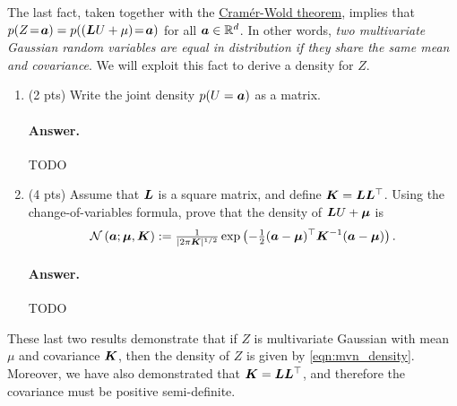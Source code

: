 \documentclass[11pt,letterpaper]{article}
\newenvironment{answer}{%
    \vspace{1em}
    \color{black}
    \paragraph{Answer.}
  }{%
    \vspace{1em}
  }
\begin{document}
The last fact, taken together with the \href{https://en.wikipedia.org/wiki/Cram\%C3\%A9r\%E2\%80\%93Wold_theorem}{Cram\'er-Wold theorem},
implies that $p(Z \! = \! {\bm{a}}) = p(({\bm{L}} U + \mu) \! = \! {\bm{a}})$ for all ${\bm{a}} \in \mathbb{R}^d$.
In other words, \emph{two multivariate Gaussian random variables are equal in distribution if they share the same mean and covariance}.
We will exploit this fact to derive a density for $Z$.


\begin{enumerate}[resume]
  \item (2 pts) Write the joint density $p(U = {\bm{a}})$ as a matrix.

\begin{answer}
  TODO
\end{answer}


  \item (4 pts) Assume that ${\bm{L}}$ is a square matrix, and define ${\bm{K}} = {\bm{L}}{\bm{L}}^\top$.
    Using the change-of-variables formula, prove that the density of ${\bm{L}} U + {\bm{\mu}}$ is
    \begin{equation}
      \mathcal{N} \left( {\bm{a}}; {\bm{\mu}}, {\bm{K}} \right)
      := \tfrac{1}{\vert 2 \pi {\bm{K}} \vert^{1/2}} \exp \left( -\tfrac{1}{2} ({\bm{a}} - {\bm{\mu}})^\top {\bm{K}}^{-1} ({\bm{a}} - {\bm{\mu}}) \right).
      \label{eqn:mvn_density}
    \end{equation}

\begin{answer}
  TODO
\end{answer}

\end{enumerate}

These last two results demonstrate that if $Z$ is multivariate Gaussian with mean $\mu$ and covariance ${\bm{K}}$,
then the density of $Z$ is given by \cref{eqn:mvn_density}.
Moreover, we have also demonstrated that ${\bm{K}} = {\bm{L}} {\bm{L}}^\top$, and therefore the covariance must be positive semi-definite.
\end{document}
